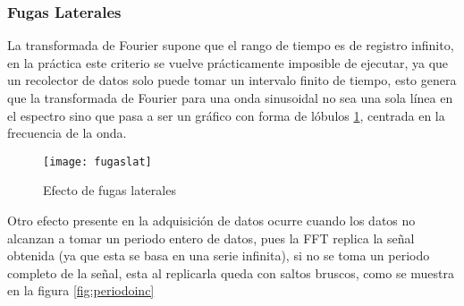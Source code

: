 			\subsubsection{Fugas Laterales}
				La transformada de Fourier supone que el rango de tiempo es de registro infinito, en la práctica este criterio se vuelve prácticamente imposible de ejecutar, ya que un recolector de datos solo puede tomar un intervalo finito de tiempo, esto genera que la transformada de Fourier para una onda sinusoidal no sea una sola línea en el espectro sino que pasa a ser un gráfico con forma de lóbulos \ref{fig:fugaslat}, centrada en la frecuencia de la onda. \\
				\newpage
				\begin{figure}
					\centering
					\texttt{[image: fugaslat]}
					\caption{Efecto de fugas laterales}
					\label{fig:fugaslat}
				\end{figure}
				Otro efecto presente en la adquisición de datos ocurre cuando los datos no alcanzan a tomar un periodo entero de datos, pues la FFT replica la señal obtenida (ya que esta se basa en una serie infinita), si no se toma un periodo completo de la señal, esta al replicarla queda con saltos bruscos, como se muestra en la figura \ref{fig:periodoinc}				
				
